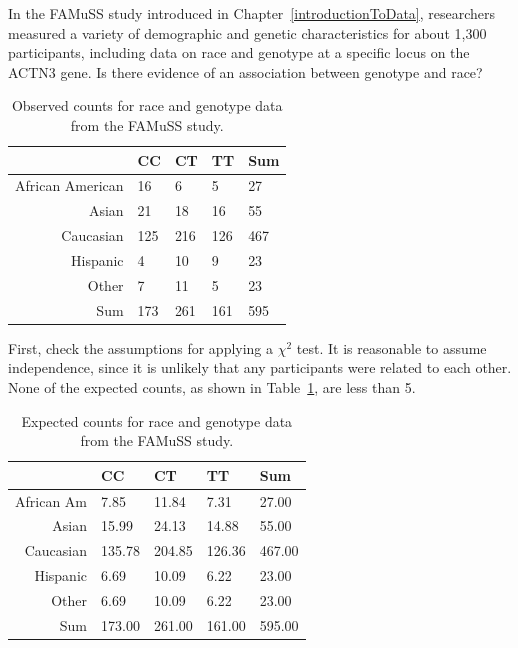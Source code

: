 \begin{example}{In the FAMuSS study introduced in Chapter~\ref{introductionToData}, researchers measured a variety of demographic and genetic characteristics for about 1,300 participants, including data on race and genotype at a specific locus on the ACTN3 gene. Is there evidence of an association between genotype and race?
		\begin{table}[ht]
			\centering
			\begin{tabular}{r | l l l | l}
				\hline
				& CC & CT & TT & Sum \\ 
				\hline
				African American & 16 & 6 & 5 & 27 \\ 
				Asian & 21 & 18 & 16 & 55 \\ 
				Caucasian & 125 & 216 & 126 & 467 \\ 
				Hispanic & 4 & 10 & 9 & 23 \\ 
				Other & 7 & 11 & 5 & 23 \\ 
				\hline
				Sum & 173 & 261 & 161 & 595 \\ 
				\hline
			\end{tabular}
			\caption{Observed counts for race and genotype data from the FAMuSS study.}
		\end{table}
	}	
	
First, check the assumptions for applying a $\chi^2$ test. It is reasonable to assume independence, since it is unlikely that any participants were related to each other. None of the expected counts, as shown in Table~\ref{famussExpected}, are less than 5.

\begin{table}[ht]
	\centering
	\begin{tabular}{r| l l l | l}
		\hline
		& CC & CT & TT & Sum \\ 
		\hline
		African Am & 7.85 & 11.84 & 7.31 & 27.00 \\ 
		Asian & 15.99 & 24.13 & 14.88 & 55.00 \\ 
		Caucasian & 135.78 & 204.85 & 126.36 & 467.00 \\ 
		Hispanic & 6.69 & 10.09 & 6.22 & 23.00 \\ 
		Other & 6.69 & 10.09 & 6.22 & 23.00 \\ 
		\hline
		Sum & 173.00 & 261.00 & 161.00 & 595.00 \\ 
		\hline
	\end{tabular}
	\caption{Expected counts for race and genotype data from the FAMuSS study.}
	\label{famussExpected}
\end{table}


\end{example}
